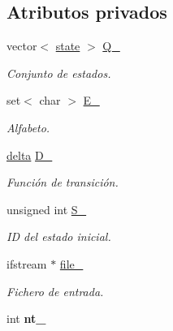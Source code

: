 \subsection*{Atributos privados}
\begin{DoxyCompactItemize}
\item 
\hypertarget{classdfa_a3b41a4d61f1cc57c768d70bae3cecb0b}{}vector$<$ \hyperlink{classstate}{state} $>$ \hyperlink{classdfa_a3b41a4d61f1cc57c768d70bae3cecb0b}{Q\+\_\+}\label{classdfa_a3b41a4d61f1cc57c768d70bae3cecb0b}

\begin{DoxyCompactList}\small\item\em Conjunto de estados. \end{DoxyCompactList}\item 
\hypertarget{classdfa_a91c828febe28d9e74dc77f5682a66e47}{}set$<$ char $>$ \hyperlink{classdfa_a91c828febe28d9e74dc77f5682a66e47}{E\+\_\+}\label{classdfa_a91c828febe28d9e74dc77f5682a66e47}

\begin{DoxyCompactList}\small\item\em Alfabeto. \end{DoxyCompactList}\item 
\hypertarget{classdfa_a40b53398c27f6237e9af6db2ce10c21a}{}\hyperlink{classdelta}{delta} \hyperlink{classdfa_a40b53398c27f6237e9af6db2ce10c21a}{D\+\_\+}\label{classdfa_a40b53398c27f6237e9af6db2ce10c21a}

\begin{DoxyCompactList}\small\item\em Función de transición. \end{DoxyCompactList}\item 
\hypertarget{classdfa_a2f92fe1842de353d0325993b36b476a8}{}unsigned int \hyperlink{classdfa_a2f92fe1842de353d0325993b36b476a8}{S\+\_\+}\label{classdfa_a2f92fe1842de353d0325993b36b476a8}

\begin{DoxyCompactList}\small\item\em I\+D del estado inicial. \end{DoxyCompactList}\item 
\hypertarget{classdfa_a5fe087486efff9153ef49810b757e43b}{}ifstream $\ast$ \hyperlink{classdfa_a5fe087486efff9153ef49810b757e43b}{file\+\_\+}\label{classdfa_a5fe087486efff9153ef49810b757e43b}

\begin{DoxyCompactList}\small\item\em Fichero de entrada. \end{DoxyCompactList}\item 
\hypertarget{classdfa_a802b0aa1e23f75956e419516a883a333}{}int {\bfseries nt\+\_\+}\label{classdfa_a802b0aa1e23f75956e419516a883a333}

\end{DoxyCompactItemize}


